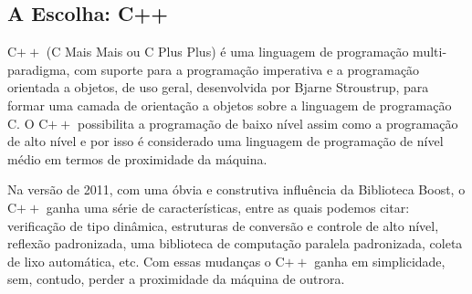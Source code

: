 \subsection{A Escolha: C++}
%
C$++$ (C Mais Mais ou C Plus Plus) \cite{Novatec} é uma linguagem de programação multi-paradigma, com suporte para a programação imperativa e a programação 
orientada a objetos, de uso geral, desenvolvida por Bjarne Stroustrup, para formar uma camada de orientação a objetos sobre a linguagem de 
programação C. O C$++$ possibilita a programação de baixo nível assim como a programação de alto nível e por isso é considerado uma linguagem 
de programação de nível médio em termos de proximidade da máquina.
\par
Na versão de 2011, com uma óbvia e construtiva influência da Biblioteca Boost, o C$++$ ganha uma série de características, entre as quais podemos
citar: verificação de tipo dinâmica, estruturas de conversão e controle de alto nível, reflexão padronizada, uma biblioteca de computação paralela 
padronizada, coleta de lixo automática, etc. Com essas mudanças o C$++$ ganha em simplicidade, sem, contudo, perder a proximidade da máquina de outrora. 
%
%
